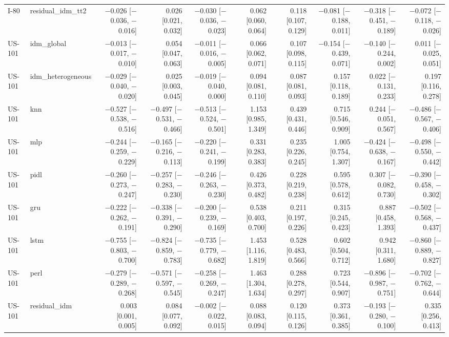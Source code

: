 \begin{table}[htbp]
{\begin{tabular}{llrrrrrrrr}
I-80 & residual\_idm\_tt2 & $-$0.026 [$-$0.036, $-$0.016] & 0.026 [0.021, 0.032] & $-$0.030 [$-$0.036, $-$0.023] & 0.062 [0.060, 0.064] & 0.118 [0.107, 0.129] & $-$0.081 [$-$0.188, 0.011] & $-$0.318 [$-$0.451, $-$0.189] & $-$0.072 [$-$0.118, $-$0.026] \\
US-101 & idm\_global & $-$0.013 [$-$0.017, $-$0.010] & 0.054 [0.047, 0.063] & $-$0.011 [$-$0.016, $-$0.005] & 0.066 [0.062, 0.071] & 0.107 [0.098, 0.115] & $-$0.154 [$-$0.439, 0.071] & $-$0.140 [$-$0.244, 0.002] & 0.011 [$-$0.025, 0.051] \\
US-101 & idm\_heterogeneous & $-$0.029 [$-$0.040, $-$0.020] & 0.025 [0.003, 0.045] & $-$0.019 [$-$0.040, 0.000] & 0.094 [0.081, 0.110] & 0.087 [0.081, 0.093] & 0.157 [0.118, 0.189] & 0.022 [$-$0.131, 0.233] & 0.197 [0.116, 0.278] \\
US-101 & knn & $-$0.527 [$-$0.538, $-$0.516] & $-$0.497 [$-$0.531, $-$0.466] & $-$0.513 [$-$0.524, $-$0.501] & 1.153 [0.985, 1.349] & 0.439 [0.431, 0.446] & 0.715 [0.546, 0.909] & 0.244 [$-$0.051, 0.567] & $-$0.486 [$-$0.567, $-$0.406] \\
US-101 & mlp & $-$0.244 [$-$0.259, $-$0.229] & $-$0.165 [$-$0.216, $-$0.113] & $-$0.220 [$-$0.241, $-$0.199] & 0.331 [0.283, 0.383] & 0.235 [0.226, 0.245] & 1.005 [0.754, 1.307] & $-$0.424 [$-$0.638, $-$0.167] & $-$0.498 [$-$0.550, $-$0.442] \\
US-101 & pidl & $-$0.260 [$-$0.273, $-$0.247] & $-$0.257 [$-$0.283, $-$0.230] & $-$0.246 [$-$0.263, $-$0.230] & 0.426 [0.373, 0.482] & 0.228 [0.219, 0.238] & 0.595 [0.578, 0.612] & 0.307 [$-$0.082, 0.730] & $-$0.390 [$-$0.458, $-$0.302] \\
US-101 & gru & $-$0.222 [$-$0.262, $-$0.191] & $-$0.338 [$-$0.391, $-$0.290] & $-$0.200 [$-$0.239, $-$0.169] & 0.538 [0.403, 0.700] & 0.211 [0.197, 0.226] & 0.315 [0.245, 0.423] & 0.887 [0.458, 1.393] & $-$0.502 [$-$0.568, $-$0.437] \\
US-101 & lstm & $-$0.755 [$-$0.803, $-$0.700] & $-$0.824 [$-$0.859, $-$0.783] & $-$0.735 [$-$0.779, $-$0.682] & 1.453 [1.116, 1.819] & 0.528 [0.483, 0.566] & 0.602 [0.504, 0.712] & 0.942 [0.311, 1.680] & $-$0.860 [$-$0.889, $-$0.827] \\
US-101 & perl & $-$0.279 [$-$0.289, $-$0.268] & $-$0.571 [$-$0.597, $-$0.545] & $-$0.258 [$-$0.269, $-$0.247] & 1.463 [1.304, 1.634] & 0.288 [0.278, 0.297] & 0.723 [0.544, 0.907] & $-$0.896 [$-$0.987, $-$0.751] & $-$0.702 [$-$0.762, $-$0.644] \\
US-101 & residual\_idm & 0.003 [0.001, 0.005] & 0.084 [0.077, 0.092] & $-$0.002 [$-$0.022, 0.015] & 0.088 [0.083, 0.094] & 0.120 [0.115, 0.126] & 0.373 [0.361, 0.385] & $-$0.193 [$-$0.280, $-$0.100] & 0.335 [0.256, 0.413] \\

\end{tabular}}
\end{table}
